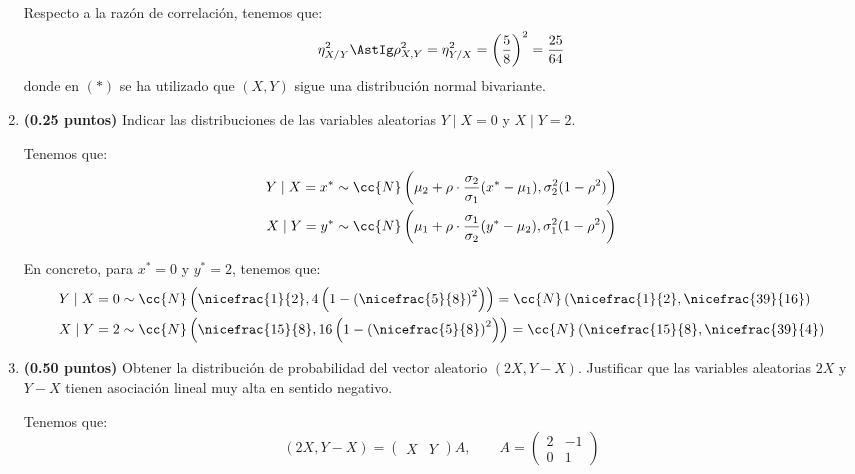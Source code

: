 \documentclass[12pt]{article}
\begin{document}
\begin{ejercicio}[1 puntos]
\begin{enumerate}
            Respecto a la razón de correlación, tenemos que:
            \begin{equation*}
                \eta_{X/Y}^2\AstIg \rho_{X,Y}^2 = \eta_{Y/X}^2=\left(\dfrac{5}{8}\right)^2 = \dfrac{25}{64}
            \end{equation*}
            donde en $(\ast)$ se ha utilizado que $(X,Y)$ sigue una distribución normal bivariante.

            \item \textbf{(0.25 puntos)} Indicar las distribuciones de las variables aleatorias $Y\mid X=0$ y $X\mid Y=2$.
            
            Tenemos que:
            \begin{align*}
                Y\mid X=x^* &\sim \cc{N}\left(\mu_2+\rho\cdot \dfrac{\sigma_2}{\sigma_1}(x^*-\mu_1),\sigma_2^2(1-\rho^2)\right) \\
                X\mid Y=y^* &\sim \cc{N}\left(\mu_1+\rho\cdot \dfrac{\sigma_1}{\sigma_2}(y^*-\mu_2),\sigma_1^2(1-\rho^2)\right)
            \end{align*}

            En concreto, para $x^*=0$ y $y^*=2$, tenemos que:
            \begin{align*}
                Y\mid X=0 &\sim \cc{N}\left(\nicefrac{1}{2},4\left(1-\left(\nicefrac{5}{8}\right)^2\right)\right) = \cc{N}\left(\nicefrac{1}{2},\nicefrac{39}{16}\right) \\
                X\mid Y=2 &\sim \cc{N}\left(\nicefrac{15}{8},16\left(1-\left(\nicefrac{5}{8}\right)^2\right)\right) = \cc{N}\left(\nicefrac{15}{8},\nicefrac{39}{4}\right)
            \end{align*}
            \item \textbf{(0.50 puntos)} Obtener la distribución de probabilidad del vector aleatorio $(2X, Y-X)$. Justificar que las variables aleatorias $2X$ y $Y-X$ tienen asociación lineal muy alta en sentido negativo.
            
            Tenemos que:
            \begin{equation*}
                (2X,Y-X) = \begin{pmatrix}
                    X & Y
                \end{pmatrix}A,\qquad A = 
                \begin{pmatrix}
                    2 & -1 \\ 0 & 1
                \end{pmatrix}
            \end{equation*}


\end{enumerate}
\end{ejercicio}
\end{document}
